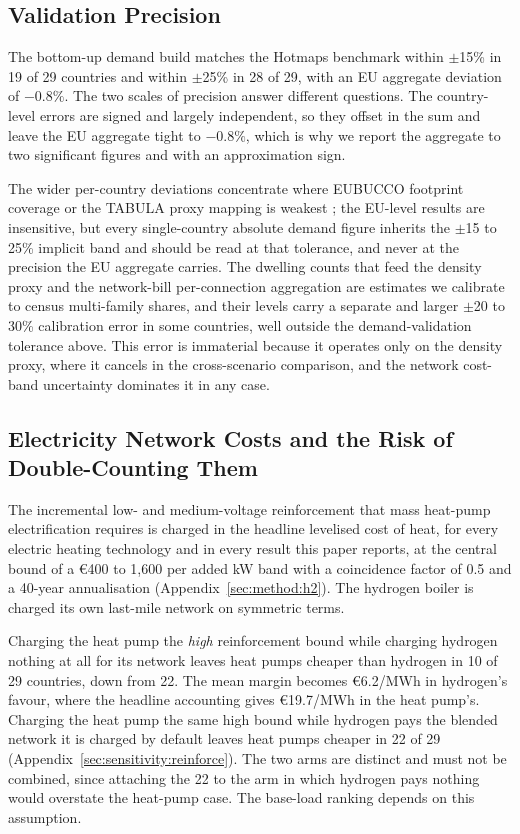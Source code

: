\subsection{Validation Precision}
The bottom-up demand build matches the Hotmaps benchmark within $\pm$15\% in 19 of 29
countries and within $\pm$25\% in 28 of 29, with an EU aggregate deviation of $-0.8\%$.
The two scales of precision answer different questions. The country-level
errors are signed and largely independent, so they offset in the sum and leave the EU
aggregate tight to $-0.8\%$, which is why we report the aggregate to two significant
figures and with an approximation sign.

The wider per-country deviations concentrate where EUBUCCO footprint coverage or the
TABULA proxy mapping is weakest \citep{MilojevicDupont2023Eubucco, Loga2016Tabula}; the
EU-level results are insensitive, but every single-country absolute demand figure
inherits the $\pm$15 to 25\% implicit band and should be read at that tolerance, and
never at the precision the EU aggregate carries. The dwelling counts that feed the
density proxy and the network-bill per-connection aggregation are estimates we calibrate
to census multi-family shares, and their levels carry a separate and larger $\pm$20 to
30\% calibration error in some countries, well outside the demand-validation tolerance
above. This error is immaterial because it operates only on the density proxy, where it
cancels in the cross-scenario comparison, and the network cost-band uncertainty
dominates it in any case.

\subsection{Electricity Network Costs and the Risk of Double-Counting Them}
The incremental low- and medium-voltage reinforcement that mass heat-pump
electrification requires is charged in the headline levelised cost of heat, for
every electric heating technology and in every result this paper reports, at the central
bound of a \euro{}400 to 1{,}600 per added kW band with a coincidence factor of 0.5 and
a 40-year annualisation (Appendix~\ref{sec:method:h2}). The hydrogen boiler is charged
its own last-mile network on symmetric terms.

Charging the heat pump the \emph{high} reinforcement bound while charging hydrogen
nothing at all for its network leaves heat pumps cheaper than hydrogen in 10 of 29
countries, down from 22. The mean margin becomes \euro{}6.2/MWh in hydrogen's favour,
where the headline accounting gives \euro{}19.7/MWh in the heat pump's. Charging the
heat pump the same high bound while hydrogen pays the blended network it is charged by
default leaves heat pumps cheaper in 22 of 29 (Appendix~\ref{sec:sensitivity:reinforce}).
The two arms are distinct and must not be combined, since attaching the 22 to the arm in
which hydrogen pays nothing would overstate the heat-pump case. The base-load ranking
depends on this assumption.

